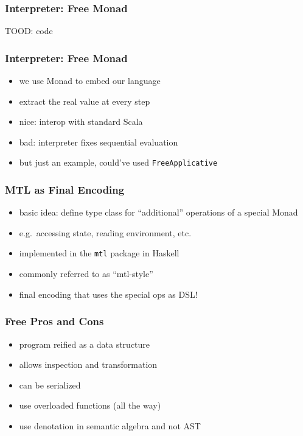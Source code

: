 \documentclass[aspectratio=169, hyperref={colorlinks, linkcolor=beamer@centricgreen}, urlcolor=links]{beamer}
\begin{document}
\begin{frame}
  \frametitle{Interpreter: Free Monad}
  TOOD: code
\end{frame}

\begin{frame}
  \frametitle{Interpreter: Free Monad}
  \begin{itemize}
  \item we use Monad to embed our language
  \item extract the real value at every step
  \item nice: interop with standard Scala
  \item bad: interpreter fixes sequential evaluation
  \item but just an example, could've used \texttt{FreeApplicative}
  \end{itemize}
\end{frame}

\begin{frame}
  \frametitle{MTL as Final Encoding}
  \begin{itemize}
  \item basic idea: define type class for ``additional'' operations of a special Monad
  \item e.g.\ accessing state, reading environment, etc.
  \item implemented in the \texttt{mtl} package in Haskell
  \item commonly referred to as ``mtl-style''
  \item final encoding that uses the special ops as DSL!\@
  \end{itemize}
\end{frame}

\begin{frame}
  \frametitle{Free \textemdash{} Pros and Cons}
  \begin{itemize}
  \item program reified as a data structure
  \item allows inspection and transformation
  \item can be serialized
  \end{itemize}
\end{frame}

\begin{frame}
  \begin{itemize}
  \item use overloaded functions (all the way)
  \item use denotation in semantic algebra and not AST
  \end{itemize}
\end{frame}
\end{document}
